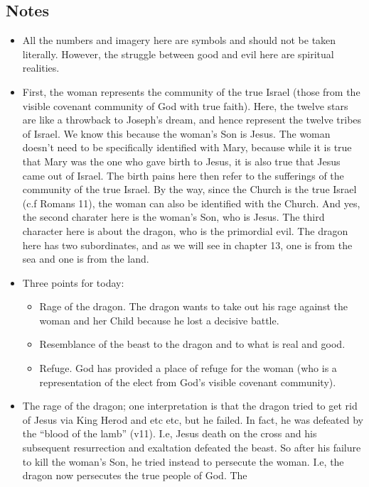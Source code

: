 \subsection*{Notes}
\begin{itemize}
  \item{All the numbers and imagery here are symbols and should not be taken
  literally.  However, the struggle between good and evil here are spiritual
  realities.}
  \item{First, the woman represents the community of the true Israel (those
  from the visible covenant community of God with true faith).  Here, the
  twelve stars are like a throwback to Joseph's dream, and hence represent
  the twelve tribes of Israel.  We know this because the woman's Son is
  Jesus.  The woman doesn't need to be specifically identified with Mary,
  because while it is true that Mary was the one who gave birth to Jesus, it
  is also true that Jesus came out of Israel.  The birth pains here then
  refer to the sufferings of the community of the true Israel.  By the way,
  since the Church is the true Israel (c.f Romans 11), the woman can also be
  identified with the Church.  And yes, the second charater here is the
  woman's Son, who is Jesus.  The third character here is about the dragon,
  who is the primordial evil.  The dragon here has two subordinates, and as
  we will see in chapter 13, one is from the sea and one is from the land.}
  \item{Three points for today:
  \begin{itemize}
    \item{Rage of the dragon.  The dragon wants to take out his rage against
    the woman and her Child because he lost a decisive battle.}
    \item{Resemblance of the beast to the dragon and to what is real and good.}
    \item{Refuge.  God has provided a place of refuge for the woman (who is a
    representation of the elect from God's visible covenant community).}
  \end{itemize}}
  \item{The rage of the dragon; one interpretation is that the dragon tried
  to get rid of Jesus via King Herod and etc etc, but he failed.  In fact, he
  was defeated by the ``blood of the lamb'' (v11).  I.e, Jesus death on the
  cross and his subsequent resurrection and exaltation defeated the beast.
  So after his failure to kill the woman's Son, he tried instead to persecute
  the woman.  I.e, the dragon now persecutes the true people of God.  The
}
\end{itemize}
